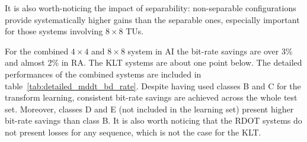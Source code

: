 \documentclass[11pt,a4paper,openright,twoside]{book}
\numberwithin{equation}{section} %
\numberwithin{figure}{section} %
\numberwithin{table}{section} %
\begin{document}
It is also worth-noticing the impact of separability:
non-separable configurations provide systematically higher gains than the
separable ones, especially important for those systems involving $8\times8$
\acp{TU}.

For the combined $4\times4$ and $8\times8$ system in \ac{AI} the bit-rate
savings are over 3\% and almost 2\% in \ac{RA}.
The \ac{KLT} systems are about one point below.
The detailed performances of the combined systems are included in
table~\ref{tab:detailed_mddt_bd_rate}.
Despite having used classes B and C for the transform learning, consistent
bit-rate savings are achieved across the whole test set.
Moreover, classes D and E (not included in the learning set) present higher
bit-rate savings than class B.
It is also worth noticing that the \ac{RDOT} systems do not present losses for
any sequence, which is not the case for the \ac{KLT}.
\end{document}
